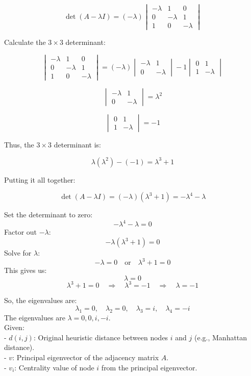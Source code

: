 \documentclass[12pt]{article}
\begin{document}
\[
\det(A - \lambda I) = (-\lambda) \begin{vmatrix}
-\lambda & 1 & 0 \\
0 & -\lambda & 1 \\
1 & 0 & -\lambda
\end{vmatrix}
\]

Calculate the \( 3 \times 3 \) determinant:

\[
\begin{vmatrix}
-\lambda & 1 & 0 \\
0 & -\lambda & 1 \\
1 & 0 & -\lambda
\end{vmatrix}
= (-\lambda) \begin{vmatrix}
-\lambda & 1 \\
0 & -\lambda
\end{vmatrix}
- 1 \begin{vmatrix}
0 & 1 \\
1 & -\lambda
\end{vmatrix}
\]

\[
\begin{vmatrix}
-\lambda & 1 \\
0 & -\lambda
\end{vmatrix} = \lambda^2
\]

\[
\begin{vmatrix}
0 & 1 \\
1 & -\lambda
\end{vmatrix} = -1
\]

Thus, the \( 3 \times 3 \) determinant is:

\[
\lambda (\lambda^2) - (-1) = \lambda^3 + 1
\]

Putting it all together:

\[
\det(A - \lambda I) = (-\lambda)(\lambda^3 + 1) = -\lambda^4 - \lambda
\]

Set the determinant to zero:
\[
-\lambda^4 - \lambda = 0
\]
Factor out \( -\lambda \):
\[
-\lambda (\lambda^3 + 1) = 0
\]
Solve for \( \lambda \):
\[
-\lambda = 0 \quad \text{or} \quad \lambda^3 + 1 = 0
\]
This gives us:
\[
\lambda = 0
\]
\[
\lambda^3 + 1 = 0 \quad \Rightarrow \quad \lambda^3 = -1 \quad \Rightarrow \quad \lambda = -1
\]

So, the eigenvalues are:
\[
\lambda_1 = 0, \quad \lambda_2 = 0, \quad \lambda_3 = i, \quad \lambda_4 = -i
\]
The eigenvalues are \( \lambda = 0, 0, i, -i \).\\
Given:\\
- \( d(i, j) \): Original heuristic distance between nodes \( i \) and \( j \) (e.g., Manhattan distance).\\
- \( v \): Principal eigenvector of the adjacency matrix \( A \).\\
- \( v_i \): Centrality value of node \( i \) from the principal eigenvector.
\end{document}
